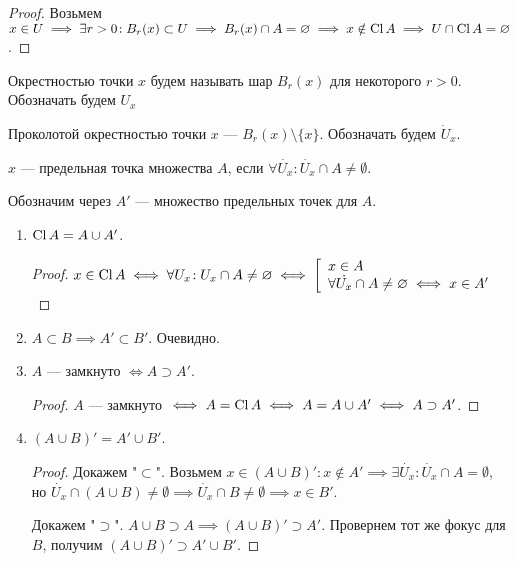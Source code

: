 \begin{proof}
    Возьмем $x \in U \implies \exists r > 0\!: B_r(x) \subset U \implies B_r(x) \cap A = \varnothing \implies x \notin \operatorname{Cl} A \implies U \cap \operatorname{Cl} A = \varnothing$.
\end{proof}
\begin{definition}
    Окрестностью точки $x$ будем называть шар  $B_r(x)$ для некоторого  $r > 0$. Обозначать будем $U_x$
\end{definition}
\begin{definition}
    Проколотой окрестностью точки $x$ ---  $B_r(x) \setminus \{x\}$. Обозначать будем $\dot{U}_x$.
\end{definition}

\begin{definition}
    $x$ --- предельная точка множества  $A$, если  $\forall \dot{U_x}\!: \dot{U_x} \cap A \neq \emptyset$.

    Обозначим через  $A'$ --- множество предельных точек для  $A$.
\end{definition}
\begin{properties}
    \slashn
    \begin{enumerate}
        \item $\operatorname{Cl} A = A \cup A'$.
            \begin{proof}
                $x \in \operatorname{Cl} A \iff \forall U_x\!: U_x \cap A \neq \varnothing \iff \left[ \begin{array}{l} x \in A \\ \forall \dot{U_x} \cap A \neq \varnothing \iff x \in A' \end{array} \right.$
            \end{proof}
        \item $A \subset B \implies A' \subset B'$. Очевидно.
        \item  $A$ --- замкнуто  $\iff A \supset A'$. 
             \begin{proof}
                $A$ --- замкнуто  $\iff A = \operatorname{Cl} A \iff A = A \cup A' \iff A \supset A'$.
            \end{proof}
        \item $(A \cup B)' = A' \cup B'$.
             \begin{proof}
                Докажем "$\subset$". Возьмем $x \in (A \cup B)'\!: x \notin A' \implies \exists \dot{U_x}\!: \dot{U_x} \cap A = \emptyset$, но $\dot{U_x} \cap (A \cup B) \neq \emptyset \implies \dot{U_x} \cap B \neq \emptyset \implies x \in B'$.

                Докажем "$\supset$". $A \cup B \supset A \implies (A \cup B)' \supset A'$. Провернем тот же фокус для  $B$, получим  $(A \cup B)' \supset A' \cup B'$.
           \end{proof}
    \end{enumerate}
\end{properties}
